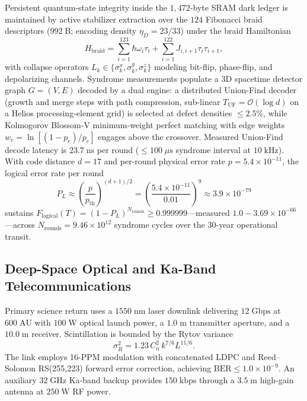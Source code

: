 \documentclass[10pt,twocolumn]{IEEEtran}
\begin{document}
Persistent quantum-state integrity inside the $1{,}472$-byte SRAM dark
ledger is maintained by active stabilizer extraction over the $124$
Fibonacci braid descriptors ($992\;\mathrm{B}$; encoding density
$\eta_D=23/33$) under the braid Hamiltonian
\begin{equation}
H_{\mathrm{braid}}=\sum_{i=1}^{123}\hbar\omega_i\tau_i
+\sum_{i=1}^{122}J_{i,i+1}\tau_i\tau_{i+1},
\label{eq:braid_hamiltonian}
\end{equation}
with collapse operators $L_k\in\{\sigma_k^x,\sigma_k^y,\sigma_k^z\}$
modeling bit-flip, phase-flip, and depolarizing channels.  Syndrome
measurements populate a 3D spacetime detector graph $G=(V,E)$ decoded
by a dual engine: a distributed Union-Find decoder (growth and merge
steps with path compression, sub-linear $T_{\mathrm{UF}}=\mathcal{O}(\log d)$
on a Helios processing-element grid) is selected at defect densities
$\leq2.5\%$, while Kolmogorov Blossom-V minimum-weight perfect matching
with edge weights $w_e=\ln[(1-p_e)/p_e]$ engages above the crossover.
Measured Union-Find decode latency is $23.7\;\mathrm{ns}$ per round
($\leq100\;\mu\mathrm{s}$ syndrome interval at $10\;\mathrm{kHz}$).
With code distance $d=17$ and per-round physical error rate
$p=5.4\times10^{-11}$, the logical error rate per round
\begin{equation}
P_L\approx\left(\frac{p}{p_{\mathrm{th}}}\right)^{(d+1)/2}
=\left(\frac{5.4\times10^{-11}}{0.01}\right)^{9}
\approx3.9\times10^{-79}
\label{eq:logical_error}
\end{equation}
sustains $F_{\mathrm{logical}}(T)=(1-P_L)^{N_{\mathrm{rounds}}}\geq
0.999999$---measured $1.0-3.69\times10^{-66}$---across
$N_{\mathrm{rounds}}=9.46\times10^{12}$ syndrome cycles over the
30-year operational transit.

\subsection{Deep-Space Optical and Ka-Band Telecommunications}
\label{sec:telecom}

Primary science return uses a $1550\;\mathrm{nm}$ laser downlink
delivering $12\;\mathrm{Gbps}$ at $600\;\mathrm{AU}$ with
$100\;\mathrm{W}$ optical launch power, a $1.0\;\mathrm{m}$ transmitter
aperture, and a $10.0\;\mathrm{m}$ receiver. Scintillation is bounded by
the Rytov variance
\begin{equation}
\sigma_R^{2}=1.23\,C_n^{2}\,k^{7/6}L^{11/6}.
\label{eq:rytov}
\end{equation}
The link employs 16-PPM modulation with concatenated LDPC and
Reed--Solomon RS(255,223) forward error correction, achieving
$\mathrm{BER}\leq1.0\times10^{-9}$. An auxiliary $32\;\mathrm{GHz}$
Ka-band backup provides $150\;\mathrm{kbps}$ through a $3.5\;\mathrm{m}$
high-gain antenna at $250\;\mathrm{W}$ RF power.
\end{document}
